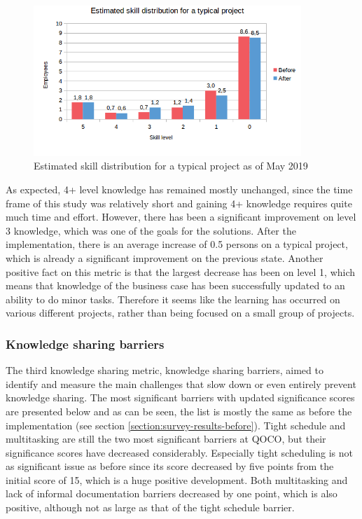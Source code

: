 \begin{figure}[ht]
  \begin{center}
    \includegraphics[width=0.9\textwidth]{images/skill-distribution-after.png}
    \caption{Estimated skill distribution for a typical project as of May 2019}
    \label{fig:skill-distribution-after}
  \end{center}
\end{figure}

As expected, 4+ level knowledge has remained mostly unchanged, since the time frame of this study was relatively short and gaining 4+ knowledge requires quite much time and effort. However, there has
been a significant improvement on level 3 knowledge, which was one of the goals for the solutions. After the implementation, there is an average increase of 0.5 persons on a typical project, which is already
a significant improvement on the previous state. Another positive fact on this metric is that the largest decrease has been on level 1, which means that knowledge of the business case has been successfully updated
to an ability to do minor tasks. Therefore it seems like the learning has occurred on various different projects, rather than being focused on a small group of projects.

\subsubsection*{Knowledge sharing barriers}

The third knowledge sharing metric, knowledge sharing barriers, aimed to identify and measure the main challenges that slow down or even entirely prevent knowledge sharing.
The most significant barriers with updated significance scores are presented below and as can be seen, the list is mostly the same as before the implementation (see section \ref{section:survey-results-before}).
Tight schedule and multitasking are still the two most significant barriers at QOCO, but their significance scores have decreased considerably. Especially tight scheduling is not as significant issue as before
since its score decreased by five points from the initial score of 15, which is a huge positive development. Both multitasking and lack of informal documentation barriers decreased by one point, which
is also positive, although not as large as that of the tight schedule barrier.


